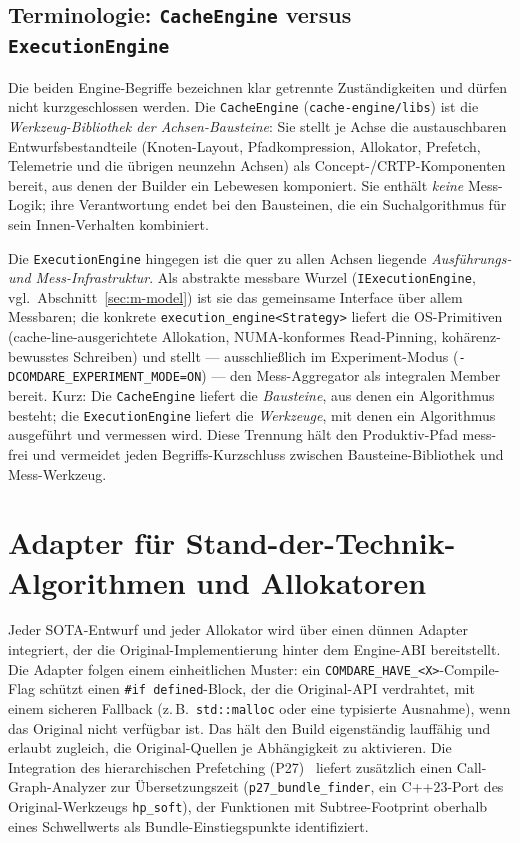 \subsection{Terminologie: \texorpdfstring{\texttt{CacheEngine}}{CacheEngine} versus \texorpdfstring{\texttt{ExecutionEngine}}{ExecutionEngine}}\label{sec:terminologie-engines}

Die beiden Engine-Begriffe bezeichnen klar getrennte Zuständigkeiten und dürfen nicht
kurzgeschlossen werden. Die \texttt{CacheEngine} (\texttt{cache-engine/libs}) ist die
\emph{Werkzeug-Bibliothek der Achsen-Bausteine}: Sie stellt je Achse die austauschbaren
Entwurfsbestandteile (Knoten-Layout, Pfadkompression, Allokator, Prefetch, Telemetrie und die
übrigen neunzehn Achsen) als Concept-/CRTP-Komponenten bereit, aus denen der Builder ein Lebewesen
komponiert. Sie enthält \emph{keine} Mess-Logik; ihre Verantwortung endet bei den Bausteinen, die
ein Suchalgorithmus für sein Innen-Verhalten kombiniert.

Die \texttt{ExecutionEngine} hingegen ist die quer zu allen Achsen liegende
\emph{Ausführungs- und Mess-Infrastruktur}. Als abstrakte messbare Wurzel
(\texttt{IExecutionEngine}, vgl.\ Abschnitt~\ref{sec:m-model}) ist sie das gemeinsame Interface über
allem Messbaren; die konkrete \texttt{execution\_engine<Strategy>} liefert die OS-Primitiven
(cache-line-ausgerichtete Allokation, NUMA-konformes Read-Pinning, kohärenz-bewusstes Schreiben) und
stellt --- ausschließlich im Experiment-Modus
(\texttt{-DCOMDARE\_\allowbreak{}EXPERIMENT\_\allowbreak{}MODE=ON}) --- den Mess-Aggregator als
integralen Member bereit. Kurz: Die \texttt{CacheEngine} liefert die \emph{Bausteine}, aus denen ein
Algorithmus besteht; die \texttt{ExecutionEngine} liefert die \emph{Werkzeuge}, mit denen ein
Algorithmus ausgeführt und vermessen wird. Diese Trennung hält den Produktiv-Pfad mess-frei und
vermeidet jeden Begriffs-Kurzschluss zwischen Bausteine-Bibliothek und Mess-Werkzeug.

\section{Adapter für Stand-der-Technik-Algorithmen und Allokatoren}\label{sec:adapters}

Jeder SOTA-Entwurf und jeder Allokator wird über einen dünnen Adapter integriert, der die
Original-Implementierung hinter dem Engine-ABI bereitstellt. Die Adapter folgen einem einheitlichen
Muster: ein \texttt{COMDARE\_HAVE\_<X>}-Compile-Flag schützt einen \texttt{\#if defined}-Block, der
die Original-API verdrahtet, mit einem sicheren Fallback (z.\,B.\ \texttt{std::malloc} oder eine
typisierte Ausnahme), wenn das Original nicht verfügbar ist. Das hält den Build eigenständig
lauffähig und erlaubt zugleich, die Original-Quellen je Abhängigkeit zu aktivieren. Die Integration
des hierarchischen Prefetching (P27)~\cite{zhang2025hierarchical} liefert zusätzlich einen
Call-Graph-Analyzer zur Übersetzungszeit (\texttt{p27\_bundle\_finder}, ein C++23-Port des
Original-Werkzeugs \texttt{hp\_soft}), der Funktionen mit Subtree-Footprint oberhalb eines
Schwellwerts als Bundle-Einstiegspunkte identifiziert.

